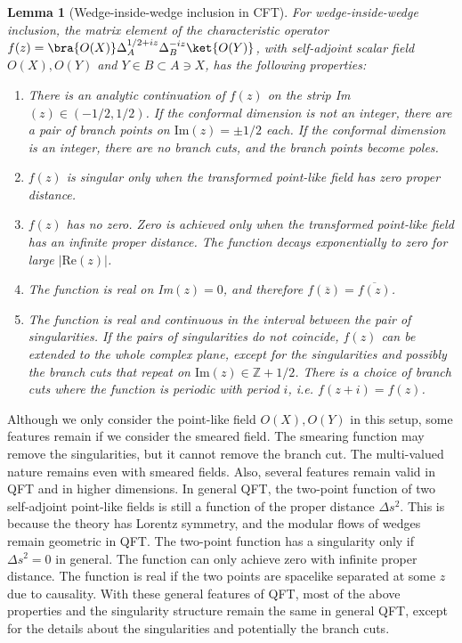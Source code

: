 \documentclass[a4paper,11pt]{article}
\newtheorem{lemma}[theorem]{Lemma}
\theoremstyle{definition}
\theoremstyle{remark}
\begin{document}
\begin{lemma} [Wedge-inside-wedge inclusion in CFT]
    For wedge-inside-wedge inclusion, the matrix element of the characteristic operator $f(z) = \bra{O(X)}\Delta_A^{1/2+iz}\Delta_B^{-iz}\ket{O(Y)}$, with self-adjoint scalar field $O(X), O(Y)$ and $Y\in B \subset A \ni X$, has the following properties:
    \begin{enumerate}
        \item There is an analytic continuation of $f(z)$ on the strip Im$(z)\in (-1/2,1/2)$. If the conformal dimension is not an integer, there are a pair of branch points on $\text{Im}(z)=\pm1/2$ each. If the conformal dimension is an integer, there are no branch cuts, and the branch points become poles.
        \item $f(z)$ is singular only when the transformed point-like field has zero proper distance.
        \item $f(z)$ has no zero. Zero is achieved only when the transformed point-like field has an infinite proper distance. The function decays exponentially to zero for large $|\text{Re}(z)|$.
        \item The function is real on Im$(z) = 0$, and therefore $f(\overline{z}) = \overline{f(z)}$.
        \item The function is real and continuous in the interval between the pair of singularities. If the pairs of singularities do not coincide, $f(z)$ can be extended to the whole complex plane, except for the singularities and possibly the branch cuts that repeat on $\text{Im}(z) \in \mathbb{Z} +1/2$. There is a choice of branch cuts where the function is periodic with period $i$, i.e. $f(z+i)=f(z)$. 
    \end{enumerate}
\end{lemma}

Although we only consider the point-like field $O(X),O(Y)$ in this setup, some features remain if we consider the smeared field. The smearing function may remove the singularities, but it cannot remove the branch cut. The multi-valued nature remains even with smeared fields. Also, several features remain valid in QFT and in higher dimensions. In general QFT, the two-point function of two self-adjoint point-like fields is still a function of the proper distance $\Delta s^2$. This is because the theory has Lorentz symmetry, and the modular flows of wedges remain geometric in QFT. The two-point function has a singularity only if $\Delta s^2 = 0$ in general. The function can only achieve zero with infinite proper distance. The function is real if the two points are spacelike separated at some $z$ due to causality. With these general features of QFT, most of the above properties and the singularity structure remain the same in general QFT, except for the details about the singularities and potentially the branch cuts. 
\end{document}
